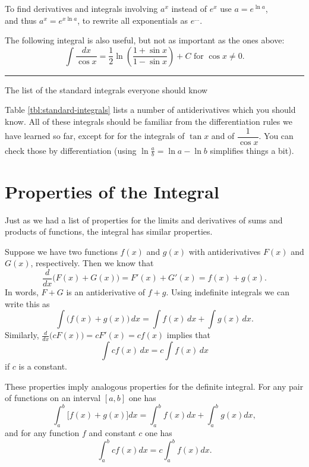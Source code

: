 \begin{table}[hb]
  To find derivatives and integrals involving $a^x$ instead of $e^x$ use
  $a = e^{\ln a}$,\\
  and thus $a^{x} = e^{x\ln a}$, to rewrite all exponentials as $e^{\ldots}$.
  \smallskip

  The following integral is also useful, but not as important as the
  ones above:
  \[
  \int \frac{ d x}{\cos x} = \frac12 \ln\left(\frac{1+\sin x}{1-\sin x}\right) +C
  \text{ for }\cos x\neq 0.
  \]
  \rule[1pt]{\textwidth}{2pt}
  \caption{The list of the standard integrals everyone should know}
  \label{tbl:standard-integrals}
\end{table}

Table \ref{tbl:standard-integrals} lists a number of antiderivatives which you
should know.  All of these integrals should be familiar from the
differentiation rules we have learned so far, except for for the integrals of
$\tan x$ and of $\dfrac1{\cos x}$.  You can check those by differentiation
(using $\ln\frac ab=\ln a-\ln b$ simplifies things a bit).


\section{Properties of the Integral} %
Just as we had a list of properties for the limits and derivatives of
sums and products of functions, the integral has similar properties.

Suppose we have two functions $f(x)$ and $g(x)$ with antiderivatives
$F(x)$ and $G(x)$, respectively.  Then we know that
\[
\frac{d}{dx}\bigl(F(x) + G(x)\bigr) = F'(x) + G'(x) = f(x) + g(x).
\]
In words, $F+G$ is an antiderivative of $f+g$.  Using indefinite
integrals we can write this as
\begin{equation}
  \label{eq:sum-of-antiderivs}
  \int\bigl( f(x) + g(x) \bigr)\, dx =
  \int f(x) \, dx +\int g(x) \, dx.
\end{equation}
Similarly, $\frac{d}{dx}\bigl(cF(x)\bigr) = cF'(x) = cf(x)$ implies
that
\begin{equation}
  \label{eq:constant-times-antideriv}
  \int cf(x) \, dx = c\int f(x) \, dx
\end{equation}
if $c$ is a constant.


These properties imply analogous properties for the definite integral.
For any pair of functions on an interval $[a, b]$ one has
\begin{equation}
  \label{eq:integral-additive}
  \int_a^b\bigl[f(x) + g(x) \bigr] dx = 
  \int_a^b f(x) dx + \int_a^bg(x) dx,
\end{equation}
and for any function $f$ and constant $c$ one has
\begin{equation}
  \label{eq:integral-homogeneous}
  \int_a^b cf(x) dx = c\int_a^bf(x)dx.
\end{equation}

